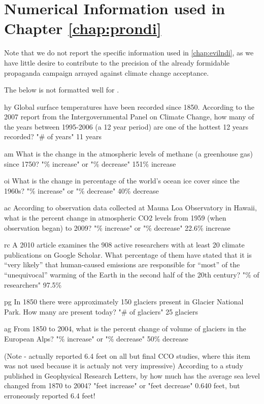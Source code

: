 \chapter{Numerical Information used in Chapter \ref{chap:prondi}}
\label{app:numbers}

Note that we do not report the specific information used in \ref{chap:evilndi},
as we have little desire to contribute to the precision of the already
formidable propaganda campaign arrayed against climate change acceptance.

The below is not formatted well for .


hy
Global surface temperatures have been recorded since 1850. According to the 2007
report from the Intergovernmental Panel on Climate Change, how many of the years
between 1995-2006 (a 12 year period) are one of the hottest 12 years recorded?
"\# of years"
11 years

am
What is the change in the atmospheric levels of methane (a greenhouse gas) since 1750?
"\% increase" or "\% decrease"
151\% increase

oi
What is the change in percentage of the world's ocean ice cover since the 1960s?
"\% increase" or "\% decrease"
40\% decrease

ac
According to observation data collected at Mauna Loa Observatory in Hawaii, what
is the percent change in atmospheric CO2 levels from 1959 (when observation
began) to 2009?
"\% increase" or "\% decrease"
22.6\% increase

rc
A 2010 article examines the 908 active researchers with at least 20 climate
publications on Google Scholar. What percentage of them have stated that it is
“very likely” that human-caused emissions are responsible for “most” of the
“unequivocal” warming of the Earth in the second half of the 20th century?
"\% of researchers"
97.5\%

pg
In 1850 there were approximately 150 glaciers present in Glacier National Park.
How many are present today?
"\# of glaciers"
25 glaciers

ag
From 1850 to 2004, what is the percent change of volume of glaciers in the European Alps?
"\% increase" or "\% decrease"
50\% decrease


(Note - actually reported 6.4 feet on all but final CCO studies, where this item
was not used because it is actualy not very impressive)
According to a study published in Geophysical Research Letters, by how much has the average sea level changed from 1870 to 2004?
"feet increase" or "feet decrease"
0.640 feet, but erroneously reported 6.4 feet!

